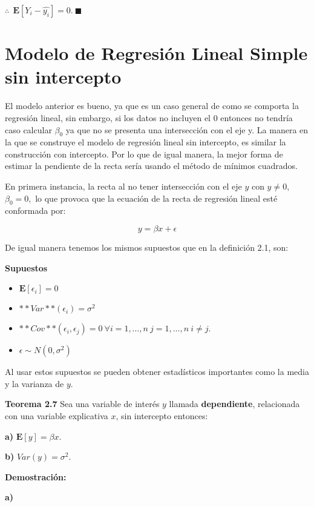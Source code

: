 \documentclass[a4paper,oneside,openany]{book}
\providecommand{\tightlist}{%
  \setlength{\itemsep}{0pt}\setlength{\parskip}{0pt}}
\begin{document}
\(\therefore \ \ \mathbf{E}\left[ Y_{i}-\hat{y_{i}}\right]=0.\  \blacksquare\)

\chapter{Modelo de Regresión Lineal Simple sin
intercepto}\label{modelo-de-regresiuxf3n-lineal-simple-sin-intercepto}

El modelo anterior es bueno, ya que es un caso general de como se
comporta la regresión lineal, sin embargo, si los datos no incluyen el 0
entonces no tendría caso calcular \(\beta_{0}\) ya que no se presenta
una intersección con el eje y. La manera en la que se construye el
modelo de regresión lineal sin intercepto, es similar la construcción
con intercepto. Por lo que de igual manera, la mejor forma de estimar la
pendiente de la recta sería usando el método de mínimos cuadrados.

En primera instancia, la recta al no tener intersección con el eje \(y\)
con \(y \neq 0,\) \(\beta_{0}=0,\) lo que provoca que la ecuación de la
recta de regresión lineal esté conformada por:

\[y=\beta x + \epsilon\]

De igual manera tenemos los mismos supuestos que en la definición 2.1,
son:

\textbf{Supuestos}

\begin{itemize}
\tightlist
\item
  \(\mathbf{E}[\epsilon_{i}]=0\)
\item
  \(**Var**(\epsilon_{i})=\sigma^2\)
\item
  \(**Cov**(\epsilon_{i},\epsilon_{j})= 0 \ \forall i = 1, \ldots, n \ j=1, \ldots, n \ i \neq j.\)
\item
  \(\epsilon \sim N(0,\sigma^2)\)
\end{itemize}

Al usar estos supuestos se pueden obtener estadísticos importantes como
la media y la varianza de \(y\).

\textbf{Teorema 2.7} Sea una variable de interés \(y\) llamada
\textbf{dependiente}, relacionada con una variable explicativa \(x\),
sin intercepto entonces:

\textbf{a)} \(\mathbf{E}[y]=\beta x.\)

\textbf{b)} \(Var(y)=\sigma^2.\)

\textbf{Demostración:}

\textbf{a)}
\end{document}
